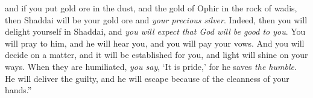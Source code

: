 \begin{biblechapter}
\verse and if you put gold ore in the dust, 
and the gold of Ophir in the rock of wadis,
\verse then Shaddai will be your gold ore 
and \textit{your precious silver}.
\verse Indeed, then you will delight yourself in Shaddai, 
and \textit{you will expect that God will be good to you}.
\verse You will pray to him, and he will hear you, 
and you will pay your vows.
\verse And you will decide on a matter, and it will be established for you, 
and light will shine on your ways.
\verse When they are humiliated, \textit{you say}, ‘It is pride,’ 
for he saves \textit{the humble}.
\verse He will deliver the guilty, 
and he will escape because of the cleanness of your hands.”
\end{biblechapter}

